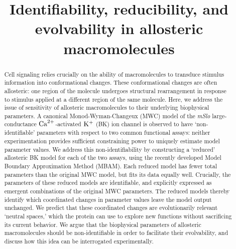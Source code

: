 \documentclass[10pt]{amsart}
\newcommand\ca{\rm{Ca}^{2+}}
\newcommand\kk{\rm{K}^+}
\begin{document}
\title{Identifiability, reducibility, and evolvability in allosteric macromolecules}


\date{\vspace{-.1in}}

\maketitle

\begin{abstract}
Cell signaling relies crucially on the ability of macromolecules to transduce stimulus information into conformational changes.
These conformational changes are often allosteric: one region of the molecule undergoes structural rearrangement in response to stimulus applied at a different region of the same molecule.  Here, we address the issue of sensitivity of allosteric macromolecules to their underlying biophysical parameters.  
%
%
A canonical Monod-Wyman-Changeux (MWC) model of  the {\it mSlo} large-conductance $\ca$-activated $\kk$ (BK) ion channel is observed to have `non-identifiable' parameters with respect to two common functional assays: neither experimentation provides sufficient constraining power to uniquely estimate model parameter values.  
%
%
We address this non-identifiability by constructing a `reduced' allosteric BK model for each of the two assays, using the recently developed Model Boundary Approximation Method (MBAM).  Each reduced model has fewer total parameters than the original MWC model, but fits its data equally well.  Crucially, the parameters of these reduced models are identifiable, and explicitly expressed as emergent combinations of the original MWC parameters.
%
The reduced models thereby identify which coordinated changes in parameter values leave the model output unchanged.  We predict that these coordinated changes are evolutionarily relevant `neutral spaces,' which the protein can use to explore new functions without sacrificing its current behavior.  We argue that the biophysical parameters of allosteric macromolecules should be non-identifiable in order to facilitate their evolvability, and discuss how this idea can be interrogated experimentally.




\end{abstract}
\end{document}
